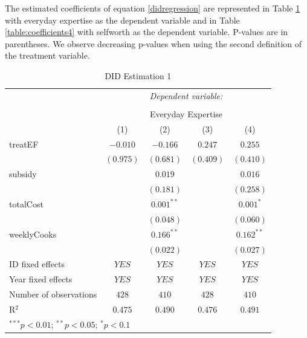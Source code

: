 \documentclass[12pt, a4paper, titlepage]{article}\usepackage[]{graphicx}\usepackage[]{color}
\begin{document}
The estimated coefficients of equation \ref{didregression} are represented in Table \ref{table:coefficients3} with everyday expertise as the dependent variable and in Table \ref{table:coefficients4} with selfworth as the dependent variable. P-values are in parentheses. We observe decreasing p-values when using the second definition of the treatment variable.

\begin{table}
\begin{center}
\begin{tabular}{l c c c c}
& \multicolumn{4}{c}{\textit{Dependent variable:}} \\
\cline{2-5}
\\[-1.8ex] & \multicolumn{4}{c}{Everyday Expertise} \\
\hline
 & (1) & (2) & (3) & (4) \\
\hline
treatEF                & $-0.010$  & $-0.166$     & $0.247$   & $0.255$      \\
                       & $(0.975)$ & $(0.681)$    & $(0.409)$ & $(0.410)$    \\
subsidy                &           & $0.019$      &           & $0.016$      \\
                       &           & $(0.181)$    &           & $(0.258)$    \\
totalCost              &           & $0.001^{**}$ &           & $0.001^{*}$  \\
                       &           & $(0.048)$    &           & $(0.060)$    \\
weeklyCooks            &           & $0.166^{**}$ &           & $0.162^{**}$ \\
                       &           & $(0.022)$    &           & $(0.027)$    \\
\hline
ID fixed effects       & $YES$     & $YES$        & $YES$     & $YES$        \\
Year fixed effects     & $YES$     & $YES$        & $YES$     & $YES$        \\
Number of observations & $428$     & $410$        & $428$     & $410$        \\
R$^2$                  & $0.475$   & $0.490$      & $0.476$   & $0.491$      \\
\hline
\multicolumn{5}{l}{\scriptsize{$^{***}p<0.01$; $^{**}p<0.05$; $^{*}p<0.1$}}
\end{tabular}
\caption{DID Estimation 1}
\label{table:coefficients3}
\end{center}
\end{table}
\end{document}
